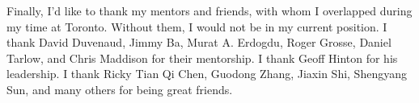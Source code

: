 Finally, I'd like to thank my mentors and friends, with whom I overlapped during my time at Toronto. 
Without them, I would not be in my current position.
I thank David Duvenaud, Jimmy Ba, Murat A. Erdogdu, Roger Grosse, Daniel Tarlow, and Chris Maddison for their mentorship. 
I thank Geoff Hinton for his leadership.
I thank Ricky Tian Qi Chen, Guodong Zhang, Jiaxin Shi, Shengyang Sun, and many others for being great friends.
